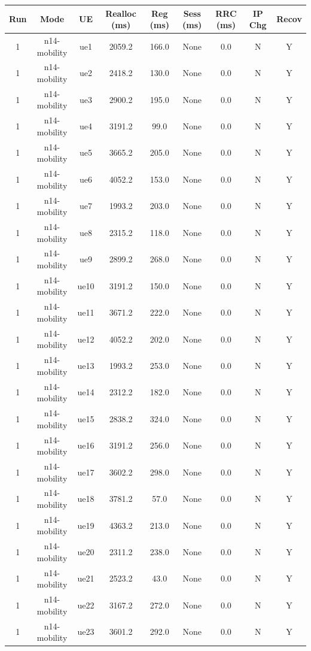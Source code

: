 \begin{table}[ht]
\centering
\begin{tabular}{|c|c|c|c|c|c|c|c|c|}
\hline
Run & Mode & UE & Realloc (ms) & Reg (ms) & Sess (ms) & RRC (ms) & IP Chg & Recov \\
\hline
1 & n14-mobility & ue1 & 2059.2 & 166.0 & None & 0.0 & N & Y \\
1 & n14-mobility & ue2 & 2418.2 & 130.0 & None & 0.0 & N & Y \\
1 & n14-mobility & ue3 & 2900.2 & 195.0 & None & 0.0 & N & Y \\
1 & n14-mobility & ue4 & 3191.2 & 99.0 & None & 0.0 & N & Y \\
1 & n14-mobility & ue5 & 3665.2 & 205.0 & None & 0.0 & N & Y \\
1 & n14-mobility & ue6 & 4052.2 & 153.0 & None & 0.0 & N & Y \\
1 & n14-mobility & ue7 & 1993.2 & 203.0 & None & 0.0 & N & Y \\
1 & n14-mobility & ue8 & 2315.2 & 118.0 & None & 0.0 & N & Y \\
1 & n14-mobility & ue9 & 2899.2 & 268.0 & None & 0.0 & N & Y \\
1 & n14-mobility & ue10 & 3191.2 & 150.0 & None & 0.0 & N & Y \\
1 & n14-mobility & ue11 & 3671.2 & 222.0 & None & 0.0 & N & Y \\
1 & n14-mobility & ue12 & 4052.2 & 202.0 & None & 0.0 & N & Y \\
1 & n14-mobility & ue13 & 1993.2 & 253.0 & None & 0.0 & N & Y \\
1 & n14-mobility & ue14 & 2312.2 & 182.0 & None & 0.0 & N & Y \\
1 & n14-mobility & ue15 & 2838.2 & 324.0 & None & 0.0 & N & Y \\
1 & n14-mobility & ue16 & 3191.2 & 256.0 & None & 0.0 & N & Y \\
1 & n14-mobility & ue17 & 3602.2 & 298.0 & None & 0.0 & N & Y \\
1 & n14-mobility & ue18 & 3781.2 & 57.0 & None & 0.0 & N & Y \\
1 & n14-mobility & ue19 & 4363.2 & 213.0 & None & 0.0 & N & Y \\
1 & n14-mobility & ue20 & 2311.2 & 238.0 & None & 0.0 & N & Y \\
1 & n14-mobility & ue21 & 2523.2 & 43.0 & None & 0.0 & N & Y \\
1 & n14-mobility & ue22 & 3167.2 & 272.0 & None & 0.0 & N & Y \\
1 & n14-mobility & ue23 & 3601.2 & 292.0 & None & 0.0 & N & Y \\

\end{tabular}
\end{table}
